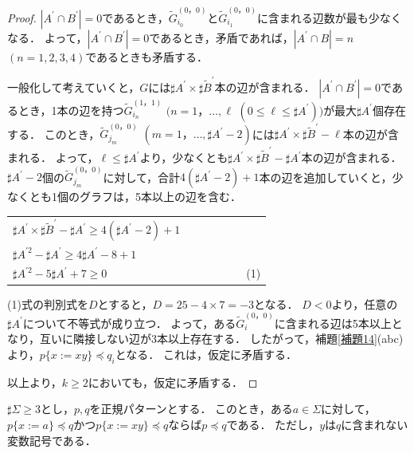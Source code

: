 \begin{proof}
$| A^{\prime} \cap B^{\prime} |=0$であるとき，$\tilde{G}^{(0，0)}_{i_{0}}$と$\tilde{G}^{(0，0)}_{i_{1}}$に含まれる辺数が最も少なくなる．
よって，$| A^{\prime} \cap B^{\prime} |=0$であるとき，矛盾であれば，$| A^{\prime} \cap B |=n$ $(n=1,2,3,4)$であるときも矛盾する．

一般化して考えていくと，$G$には$\sharp A^{\prime} \times \sharp\tilde{B}^{\prime}$本の辺が含まれる．
$| A^{\prime} \cap B^{\prime} |=0$であるとき，1本の辺を持つ$\tilde{G}^{(1，1)}_{i_{n}}$ $(n=1，\ldots, \ell$ $(0 \le \ell \le \sharp A^{\prime}))$が最大$\sharp A^{\prime}$個存在する．
このとき，$\tilde{G}^{(0，0)}_{j_{m}}$ $(m=1，\ldots, \sharp A^{\prime}-2)$には$\sharp A^{\prime} \times \sharp\tilde{B}^{\prime} - \ell$本の辺が含まれる．
よって，$\ell \le \sharp A^{\prime}$より，少なくとも$\sharp A^{\prime} \times \sharp\tilde{B}^{\prime} - \sharp A^{\prime}$本の辺が含まれる．
$\sharp A^{\prime}-2$個の$\tilde{G}^{(0，0)}_{j_{m}}$に対して，合計$4(\sharp A^{\prime}-2) +1$本の辺を追加していくと，少なくとも1個のグラフは，5本以上の辺を含む．

\begin{center}
  \begin{tabular}{l}
  $\sharp A^{\prime} \times \sharp\tilde{B}^{\prime} -\sharp A^{\prime} \ge 4(\sharp A^{\prime}-2)+1$\\
  $\sharp A^{\prime 2}-\sharp A^{\prime} \ge 4\sharp A^{\prime}-8+1$\\
  $\sharp A^{\prime 2}-5\sharp A^{\prime}+7 \ge 0$~~~~~~~~~~~~~~~~~~~~~~~~~(1)
\end{tabular}
\end{center}


(1)式の判別式を$D$とすると，$D=25-4\times7=-3$となる．
$D<0$より，任意の$\sharp A^{\prime}$について不等式が成り立つ．
よって，ある$\tilde{G}^{(0，0)}_{i}$に含まれる辺は5本以上となり，互いに隣接しない辺が3本以上存在する．
したがって，補題\ref{補題14}(abc)より，$p \{x:=xy \} \preceq q_{i}$となる．
これは，仮定に矛盾する．  

以上より，$k \ge 2$においても，仮定に矛盾する．
\end{proof}

\begin{lem}\label{補題15}
$\sharp \Sigma \ge 3$とし，$p,q$を正規パターンとする．
このとき，ある$a \in \Sigma$に対して，
$p \{ x := a \} \preceq q$かつ$p \{ x := xy \} \preceq q$ならば$p \preceq q$である．
ただし，$y$は$q$に含まれない変数記号である．
\end{lem}


